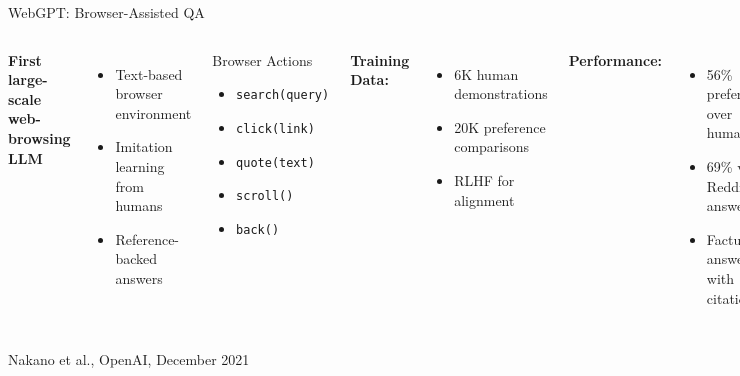 \documentclass[aspectratio=169]{beamer}
\begin{document}
\begin{frame}{WebGPT: Browser-Assisted QA}
	\begin{columns}
		\textbf{First large-scale web-browsing LLM}
		
		\begin{itemize}
			\item Text-based browser environment
			\item Imitation learning from humans
			\item Reference-backed answers
		\end{itemize}
		
		\begin{block}{Browser Actions}
			\small
			\begin{itemize}
				\item \texttt{search(query)}
				\item \texttt{click(link)}
				\item \texttt{quote(text)}
				\item \texttt{scroll()}
				\item \texttt{back()}
			\end{itemize}
		\end{block}
		
		\textbf{Training Data:}
		\begin{itemize}
			\item 6K human demonstrations
			\item 20K preference comparisons
			\item RLHF for alignment
		\end{itemize}
		
		\textbf{Performance:}
		\begin{itemize}
			\item {\color{highlight}56\%} preferred over humans
			\item {\color{highlight}69\%} vs Reddit answers
			\item Factual answers with citations
		\end{itemize}
	\end{columns}
	
	\vspace{0.3cm}
	\small
	Nakano et al., OpenAI, December 2021
\end{frame}
\end{document}
